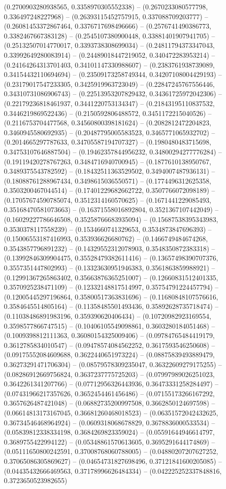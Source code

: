 (0.2700903280938565, 0.3358970305552338) -- (0.2670233080577798, 0.336497248227968) -- (0.26393115452757915, 0.337088709203777) -- (0.26081453372867464, 0.3376717698496666) -- (0.2576741490386773, 0.3382467667383128) -- (0.2545107380900448, 0.33881401907941705) -- (0.25132507014770017, 0.3393738308699034) -- (0.24811794373347043, 0.33992649280083914) -- (0.24489018447219052, 0.340472283953214) -- (0.24164264313701403, 0.34101147330988607) -- (0.2383761938739089, 0.34154432110694694) -- (0.23509173258749344, 0.34207108004429193) -- (0.23179017547233305, 0.3425919963723049) -- (0.22847245767556446, 0.34310731086906743) -- (0.22513953207829432, 0.34361725972042306) -- (0.22179236818461937, 0.3441220753134347) -- (0.21843195110837532, 0.3446219869522436) -- (0.2150592806488572, 0.3451172215040526) -- (0.2116753704477568, 0.34560800398181624) -- (0.2082812472204823, 0.3460945580692935) -- (0.20487795005583523, 0.3465771065932702) -- (0.2014665297787633, 0.34705587194707327) -- (0.1980480483715698, 0.34753107646887504) -- (0.19462357844956232, 0.34800294277776284) -- (0.19119420278767263, 0.3484716940700945) -- (0.1877610138950767, 0.3489375543782592) -- (0.18432511363529502, 0.3494007487936131) -- (0.18088761288967434, 0.3498615036550571) -- (0.1774496312625358, 0.3503200467044514) -- (0.17401229682662722, 0.3507766072098189) -- (0.17057674590785074, 0.3512314160570625) -- (0.1671441229085493, 0.35168470581073663) -- (0.16371558016892804, 0.3521367107442049) -- (0.16029227786646508, 0.35258766683935094) -- (0.15687538395343983, 0.3530378117558239) -- (0.1534660741329653, 0.3534873847696393) -- (0.15006553187416993, 0.353936626680762) -- (0.1466749484674268, 0.3543857796891232) -- (0.14329552312078903, 0.3548350872383318) -- (0.13992846309904475, 0.35528479382611416) -- (0.13657498390707376, 0.3557351447802993) -- (0.13323630951946383, 0.3561863859988921) -- (0.12991367265863402, 0.35663876365251007) -- (0.12660831512401335, 0.3570925238471109) -- (0.12332148817514997, 0.35754791224457794) -- (0.12005445297196864, 0.35800517363831696) -- (0.11680848107576616, 0.3584645514805164) -- (0.11358485501493436, 0.35892628735718474) -- (0.11038486891983196, 0.359390620406434) -- (0.10720982923169554, 0.3598577866747515) -- (0.10406105549098861, 0.3603280184051468) -- (0.1009398812111363, 0.36080154325009406) -- (0.09784765484419179, 0.3612785834010547) -- (0.09478574084562252, 0.3617593546250608) -- (0.09175552084609688, 0.3622440651973224) -- (0.08875839493889479, 0.36273291471706304) -- (0.08579578309235047, 0.36322609279175255) -- (0.08286912669756824, 0.3637237775725203) -- (0.07997989026251023, 0.3642261341207766) -- (0.07712956326443936, 0.36473331258284497) -- (0.07431966217357626, 0.3652454461456486) -- (0.07155173266167292, 0.3657626487421048) -- (0.06882735200997508, 0.3662850124697598) -- (0.06614813173167045, 0.36681260468018523) -- (0.06351572042432625, 0.36734546468964924) -- (0.0609318068678829, 0.3678836000533534) -- (0.05839812338334198, 0.3684269823359024) -- (0.05591644946614797, 0.3689755422994122) -- (0.05348861570613605, 0.3695291644174869) -- (0.05111650800242591, 0.37008768060788005) -- (0.04880207207627252, 0.37065086305869627) -- (0.04654731827698496, 0.37121841600205085) -- (0.04435432666469563, 0.37178996626484334) -- (0.042225252337848816, 0.3723650523982655) 